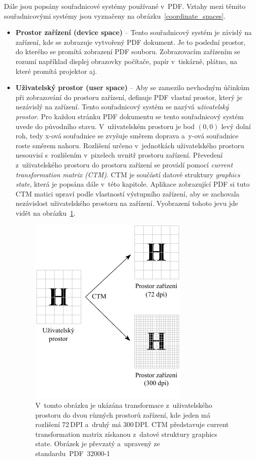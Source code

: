 Dále jsou popsány souřadnicové systémy používané v~PDF. Vztahy mezi těmito
souřadnicovými systémy jsou vyznačeny na obrázku~\ref{coordinate_spaces}.
\begin{itemize}
    \item \textbf{Prostor zařízení (device space)} -- Tento souřadnicový systém je
    závislý na zařízení, kde se zobrazuje vytvořený PDF dokument. Je to poslední
    prostor, do kterého se promítá zobrazení PDF souboru. Zobrazovacím zařízením
    se rozumí například displej obrazovky počítače, papír v~tiskárně, plátno, na
    které promítá projektor aj.
    
    \item \textbf{Uživatelský prostor (user space)} -- Aby se zamezilo nevhodným
    účinkům při zobrazování do prostoru zařízení, definuje PDF vlastní prostor,
    který je nezávislý na zařízení. Tento souřadnicový systém se nazývá
    \emph{uživatelský prostor}. Pro každou stránku PDF dokumentu se tento
    souřadnicový systém uvede do původního stavu. V~uživatelském prostoru je bod
    $(0, 0)$ levý dolní roh, tedy x-ová souřadnice se zvyšuje směrem
    doprava a~y-ová souřadnice roste směrem nahoru. Rozlišení určeno v~jednotkách
    uživatelského prostoru nesouvisí s~rozlišením v~pixelech uvnitř prostoru
    zařízení. Převedení z~uživatelského prostoru do prostoru zařízení se provádí
    pomocí \emph{current transformation matrix (CTM)}. CTM je součástí datové
    struktury \emph{graphics state}, která je popsána dále v~této kapitole.
    Aplikace zobrazující PDF si tuto CTM matici upraví podle vlastností výstupního
    zařízení, aby se zachovala nezávislost uživatelského prostoru na zařízení. 
    Vyobrazení tohoto jevu jde vidět na obrázku~\ref{pic_user_to_device}.

    \begin{figure}[H]
        \centering
        \includegraphics[width=0.5\linewidth]{obrazky-figures/user_to_device_space.pdf}
        \caption{
            V~tomto obrázku je ukázána transformace z~uživatelského prostoru
            do dvou různých prostorů zařízení, kde jeden má rozlišení 72\,DPI 
            a~druhý má 300\,DPI. CTM představuje current transformation matrix
            získanou z~datové struktury graphics state.
            Obrázek je převzatý a~upravený ze
            standardu~PDF~32000-1~\cite[k.~8.3.2.3, s.~116]{PDF32000-1:2008}
        }
        \label{pic_user_to_device}
    \end{figure}
    

\end{itemize}
